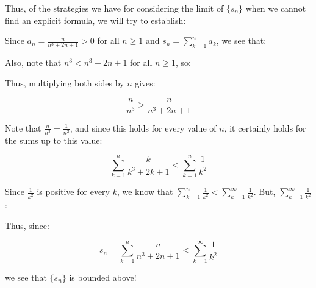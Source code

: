 \documentclass{ximera}
\begin{document}
\begin{exercise}
\begin{exercise}
Thus, of the strategies we have for considering the limit of $\{s_n\}$ when we cannot find an explicit formula, we will try to establish:

\begin{selectAll}
\end{selectAll}

Since $a_n = \frac{n}{n^3+2n+1} > 0$ for all $n \geq 1$ and $s_n = \sum_{k=1}^n a_k$,  we see that:

\begin{multipleChoice}
\end{multipleChoice}

Also, note that $n^3 < n^3+2n+1$ for all $n \geq 1$, so:
\begin{multipleChoice}
\end{multipleChoice}

Thus, multiplying both sides by $n$ gives:

\[
\frac{n}{n^3} > \frac{n}{n^3+2n+1}
\]

Note that $\frac{n}{n^3} = \frac{1}{n^2}$, and since this holds for every value of $n$, it certainly holds for the sums up to this value:

\[
\sum_{k=1}^n \frac{k}{k^3+2k+1} < \sum_{k=1}^n \frac{1}{k^2}
\]

Since $\frac{1}{k^2}$ is positive for every $k$, we know that $\sum_{k=1}^n \frac{1}{k^2} < \sum_{k=1}^{\infty} \frac{1}{k^2}$.  But, $\sum_{k=1}^{\infty} \frac{1}{k^2}$:

\begin{multipleChoice}
\end{multipleChoice}

Thus, since:

\[
s_n = \sum_{k=1}^n \frac{n}{n^3+2n+1} < \sum_{k=1}^{\infty} \frac{1}{k^2}
\]

we see that $\{s_n\}$ is bounded above!


\end{exercise}
\end{exercise}
\end{document}
